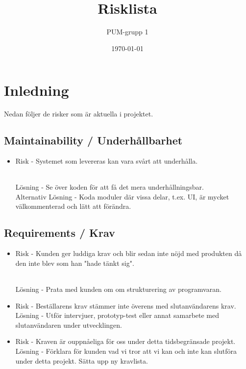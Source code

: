 

\ifpdf
\else
\fi

\title{Risklista}
\author{PUM-grupp 1}
\date{\today}



\maketitle\thispagestyle{empty}

\newpage

\setcounter{tocdepth}{2}
\tableofcontents
\newpage

\section{Inledning}

Nedan följer de risker som är aktuella i projektet.


\subsection{Maintainability / Underhållbarhet}
\begin{itemize}
\item Risk - Systemet som levereras kan vara svårt att underhålla.

\\Lösning - Se över koden för att få det mera underhållningsbar.
\\Alternativ Lösning - Koda moduler där vissa delar, t.ex. UI, är mycket välkommenterad och lätt att förändra.

\end{itemize}

\subsection{Requirements / Krav}
\begin{itemize}
\item Risk - Kunden ger luddiga krav och blir sedan inte nöjd med produkten då den inte blev som han "hade tänkt sig".

\\Lösning - Prata med kunden om om strukturering av programvaran.
\item Risk - Beställarens krav stämmer inte överens med slutanvändarens krav.
\\Lösning - Utför intervjuer, prototyp-test eller annat samarbete med slutanvändaren under utvecklingen.
\item Risk - Kraven är ouppnåeliga för oss under detta tidsbegränsade projekt.
\\Lösning - Förklara för kunden vad vi tror att vi kan och inte kan slutföra under detta projekt. Sätta upp ny kravlista.
\end{itemize}

